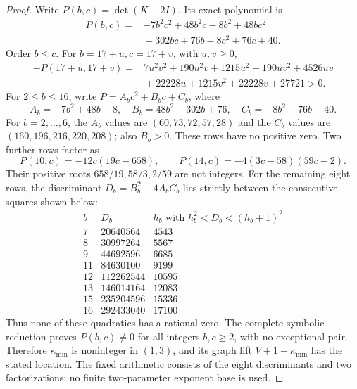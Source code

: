 \begin{proof}
Write $P(b,c)=\det(K-2I)$. Its exact polynomial is
\begin{align*}
P(b,c)={}&-7b^2c^2+48b^2c-8b^2+48bc^2\\
         &{}+302bc+76b-8c^2+76c+40.
\end{align*}
Order $b\leq c$. For $b=17+u,c=17+v$, with $u,v\geq0$,
\begin{align*}
-P(17+u,17+v)={}&7u^2v^2+190u^2v+1215u^2+190uv^2+4526uv\\
                &{}+22228u+1215v^2+22228v+27721>0.
\end{align*}
For $2\leq b\leq16$, write $P=A_bc^2+B_bc+C_b$, where
\[
A_b=-7b^2+48b-8,\quad B_b=48b^2+302b+76,\quad C_b=-8b^2+76b+40.
\]
For $b=2,\ldots,6$, the $A_b$ values are $(60,73,72,57,28)$
and the $C_b$ values are $(160,196,216,220,208)$; also $B_b>0$.
These rows have no positive zero. Two further rows factor as
\[
P(10,c)=-12c(19c-658),\qquad P(14,c)=-4(3c-58)(59c-2).
\]
Their positive roots $658/19,58/3,2/59$ are not integers.
For the remaining eight rows, the discriminant $D_b=B_b^2-4A_bC_b$
lies strictly between the consecutive squares shown below:
\[
\begin{array}{r|r|r}
b&D_b&h_b\text{ with }h_b^2<D_b<(h_b+1)^2\\\hline
7&20640564&4543\\
8&30997264&5567\\
9&44692596&6685\\
11&84630100&9199\\
12&112262544&10595\\
13&146014164&12083\\
15&235204596&15336\\
16&292433040&17100
\end{array}
\]
Thus none of these quadratics has a rational zero. The complete
symbolic reduction proves $P(b,c)\ne0$ for all integers $b,c\geq2$,
with no exceptional pair. Therefore $\kappa_{\min}$ is noninteger
in $(1,3)$, and its graph lift $V+1-\kappa_{\min}$ has the stated
location. The fixed arithmetic consists of the eight discriminants
and two factorizations; no finite two-parameter exponent base is used.
\end{proof}
